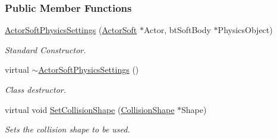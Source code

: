\subsubsection*{Public Member Functions}
\begin{DoxyCompactItemize}
\item 
\hyperlink{classMezzanine_1_1ActorSoftPhysicsSettings_a1dbdd3a7b8af36cb8353a1af90102073}{ActorSoftPhysicsSettings} (\hyperlink{classMezzanine_1_1ActorSoft}{ActorSoft} $\ast$Actor, btSoftBody $\ast$PhysicsObject)
\begin{DoxyCompactList}\small\item\em Standard Constructor. \item\end{DoxyCompactList}\item 
\hypertarget{classMezzanine_1_1ActorSoftPhysicsSettings_a9bd95e4279191ab50e5d60ad4ec07817}{
virtual \hyperlink{classMezzanine_1_1ActorSoftPhysicsSettings_a9bd95e4279191ab50e5d60ad4ec07817}{$\sim$ActorSoftPhysicsSettings} ()}
\label{classMezzanine_1_1ActorSoftPhysicsSettings_a9bd95e4279191ab50e5d60ad4ec07817}

\begin{DoxyCompactList}\small\item\em Class destructor. \item\end{DoxyCompactList}\item 
virtual void \hyperlink{classMezzanine_1_1ActorSoftPhysicsSettings_a4cbaf52fbdedf9c4e0328d3dd608207e}{SetCollisionShape} (\hyperlink{classMezzanine_1_1CollisionShape}{CollisionShape} $\ast$Shape)
\begin{DoxyCompactList}\small\item\em Sets the collision shape to be used. \item\end{DoxyCompactList}\end{DoxyCompactItemize}
